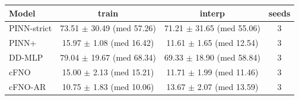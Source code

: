 \begin{tabular}{lccc}
\toprule
Model & train & interp & seeds \\
\midrule
PINN-strict & 73.51 $\pm$ 30.49 (med 57.26) & 71.21 $\pm$ 31.65 (med 55.06) & 3 \\
PINN+ & 15.97 $\pm$ 1.08 (med 16.42) & 11.61 $\pm$ 1.65 (med 12.54) & 3 \\
DD-MLP & 79.04 $\pm$ 19.67 (med 68.34) & 69.33 $\pm$ 18.90 (med 58.84) & 3 \\
cFNO & 15.00 $\pm$ 2.13 (med 15.21) & 11.71 $\pm$ 1.99 (med 11.46) & 3 \\
cFNO-AR & 10.75 $\pm$ 1.83 (med 10.06) & 13.67 $\pm$ 2.07 (med 13.59) & 3 \\
\bottomrule
\end{tabular}
